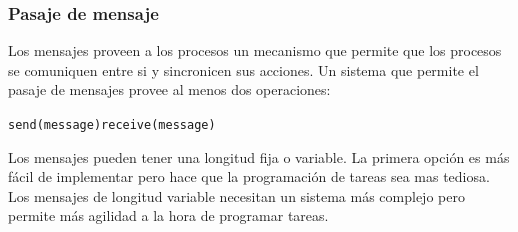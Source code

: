 \subsubsection{Pasaje de mensaje}
Los mensajes proveen a los procesos un mecanismo que permite que los procesos se comuniquen entre si y sincronicen sus acciones. Un sistema que permite el pasaje de mensajes provee al menos dos operaciones:
\begin{center}
    \texttt{send(message)}\hspace*{1cm}\texttt{receive(message)}
\end{center}

Los mensajes pueden tener una longitud fija o variable. La primera opción es más fácil de implementar pero hace que la programación de tareas sea mas tediosa. Los mensajes de longitud variable necesitan un sistema más complejo pero permite más agilidad a la hora de programar tareas.


